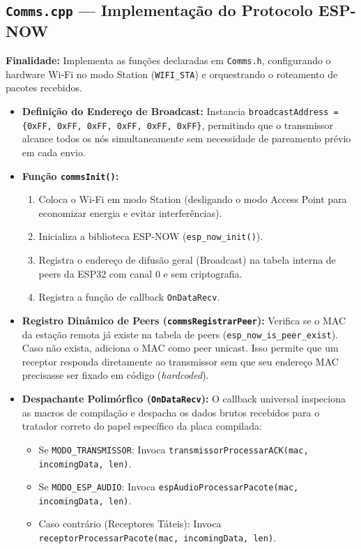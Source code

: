\documentclass[12pt,a4paper]{article}
\begin{document}
\subsection{\texttt{Comms.cpp} --- Implementação do Protocolo ESP-NOW}
\textbf{Finalidade:} Implementa as funções declaradas em \texttt{Comms.h}, configurando o hardware Wi-Fi no modo Station (\texttt{WIFI\_STA}) e orquestrando o roteamento de pacotes recebidos.

\begin{itemize}
    \item \textbf{Definição do Endereço de Broadcast:} Instancia \texttt{broadcastAddress = \{0xFF, 0xFF, 0xFF, 0xFF, 0xFF, 0xFF\}}, permitindo que o transmissor alcance todos os nós simultaneamente sem necessidade de pareamento prévio em cada envio.
    \item \textbf{Função \texttt{commsInit()}:}
    \begin{enumerate}
        \item Coloca o Wi-Fi em modo Station (desligando o modo Access Point para economizar energia e evitar interferências).
        \item Inicializa a biblioteca ESP-NOW (\texttt{esp\_now\_init()}).
        \item Registra o endereço de difusão geral (Broadcast) na tabela interna de peers da ESP32 com canal 0 e sem criptografia.
        \item Registra a função de callback \texttt{OnDataRecv}.
    \end{enumerate}
    \item \textbf{Registro Dinâmico de Peers (\texttt{commsRegistrarPeer}):} Verifica se o MAC da estação remota já existe na tabela de peers (\texttt{esp\_now\_is\_peer\_exist}). Caso não exista, adiciona o MAC como peer unicast. Isso permite que um receptor responda diretamente ao transmissor sem que seu endereço MAC precisasse ser fixado em código (\textit{hardcoded}).
    \item \textbf{Despachante Polimórfico (\texttt{OnDataRecv}):} O callback universal inspeciona as macros de compilação e despacha os dados brutos recebidos para o tratador correto do papel específico da placa compilada:
    \begin{itemize}
        \item Se \texttt{MODO\_TRANSMISSOR}: Invoca \texttt{transmissorProcessarACK(mac, incomingData, len)}.
        \item Se \texttt{MODO\_ESP\_AUDIO}: Invoca \texttt{espAudioProcessarPacote(mac, incomingData, len)}.
        \item Caso contrário (Receptores Táteis): Invoca \texttt{receptorProcessarPacote(mac, incomingData, len)}.
    \end{itemize}
\end{itemize}
\end{document}

